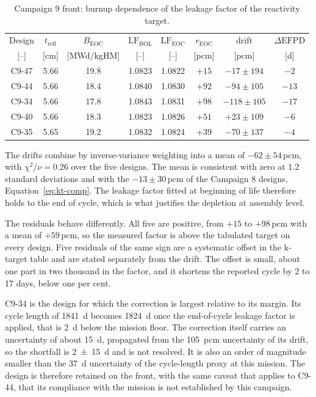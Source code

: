 \begin{table}[htbp]
  \centering
  \small
  \caption{Campaign 9 front: burnup dependence of the leakage factor of the reactivity target.}
  \label{tab:c9-kt-burnup}
  \setlength{\tabcolsep}{4.2pt}
  \begin{tabular}{cccccccc}
    \toprule
    Design & $t_\mathrm{refl}$ & $B_\mathrm{EOC}$ & $\mathrm{LF}_\mathrm{BOL}$ &
      $\mathrm{LF}_\mathrm{EOC}$ & $r_\mathrm{EOC}$ & drift &
      $\Delta\mathrm{EFPD}$ \\
    {[--]} & [cm] & [MWd/kgHM] & [--] & [--] & [pcm] & [pcm] & [d] \\
    \midrule
    C9-47 & 5.66 & 19.8 & 1.0823 & 1.0822 & $+15$ & $-17 \pm 194$ & $-2$ \\
    C9-44 & 5.66 & 18.4 & 1.0840 & 1.0830 & $+92$ & $-94 \pm 105$ & $-13$ \\
    C9-34 & 5.66 & 17.8 & 1.0843 & 1.0831 & $+98$ & $-118 \pm 105$ & $-17$ \\
    C9-40 & 5.66 & 18.3 & 1.0823 & 1.0826 & $+51$ & $+23 \pm 109$ & $-6$ \\
    C9-35 & 5.65 & 19.2 & 1.0832 & 1.0824 & $+39$ & $-70 \pm 137$ & $-4$ \\
    \bottomrule
  \end{tabular}
\end{table}

The drifts combine by inverse-variance weighting into a mean of
$-62 \pm 54$\,pcm, with $\chi^2/\nu = 0.26$ over the five designs. The mean is
consistent with zero at 1.2 standard deviations and with the $-13 \pm 30$\,pcm
of the Campaign 8 designs, Equation~\eqref{eq:kt-comp}. The leakage factor
fitted at beginning of life therefore holds to the end of cycle, which is
what justifies the depletion at assembly level.

The residuals behave differently. All five are positive, from $+15$ to
$+98$\,pcm with a mean of $+59$\,pcm, so the measured factor is above the
tabulated target on every design. Five residuals of the same sign are a
systematic offset in the k-target table and are stated separately from the
drift. The offset is small, about one part in two thousand in the factor,
and it shortens the reported cycle by 2 to 17 days, below one per cent.

C9-34 is the design for which the correction is largest relative to its
margin. Its cycle length of \SI{1841}{d} becomes \SI{1824}{d} once the
end-of-cycle leakage factor is applied, that is \SI{2}{d} below the mission
floor. The correction itself carries an uncertainty of about \SI{15}{d},
propagated from the \SI{105}{pcm} uncertainty of its drift, so the shortfall
is \SI{2+-15}{d} and is not resolved. It is also an order of magnitude
smaller than the \SI{37}{d} uncertainty of the cycle-length proxy at this
mission. The design is therefore retained on the front, with the same caveat
that applies to C9-44, that its compliance with the mission is not
established by this campaign.

